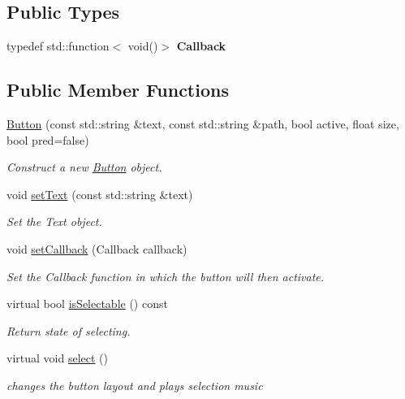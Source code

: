 \subsection*{Public Types}
\begin{DoxyCompactItemize}
\item 
\mbox{\label{classButton_a9e04a84d89368e9a5b1205bbcdd1a9b0}} 
typedef std\+::function$<$ void()$>$ {\bfseries Callback}
\end{DoxyCompactItemize}
\subsection*{Public Member Functions}
\begin{DoxyCompactItemize}
\item 
\hyperlink{classButton_a421ba03df1f2038625a179d72ade06a8}{Button} (const std\+::string \&text, const std\+::string \&path, bool active, float size, bool pred=false)
\begin{DoxyCompactList}\small\item\em Construct a new \hyperlink{classButton}{Button} object. \end{DoxyCompactList}\item 
void \hyperlink{classButton_ac6a233c876164a52d54ef7f1b3fb78d1}{set\+Text} (const std\+::string \&text)
\begin{DoxyCompactList}\small\item\em Set the Text object. \end{DoxyCompactList}\item 
void \hyperlink{classButton_a694455fc4d23bf1dd91836f9692933ad}{set\+Callback} (Callback callback)
\begin{DoxyCompactList}\small\item\em Set the Callback function in which the button will then activate. \end{DoxyCompactList}\item 
virtual bool \hyperlink{classButton_a6f51f01b72f9c3319e96263dc59a677f}{is\+Selectable} () const
\begin{DoxyCompactList}\small\item\em Return state of selecting. \end{DoxyCompactList}\item 
\mbox{\label{classButton_a0d567e275b73139fe0300f395f657656}} 
virtual void \hyperlink{classButton_a0d567e275b73139fe0300f395f657656}{select} ()
\begin{DoxyCompactList}\small\item\em changes the button layout and plays selection music \end{DoxyCompactList}\item 

\end{DoxyCompactItemize}
